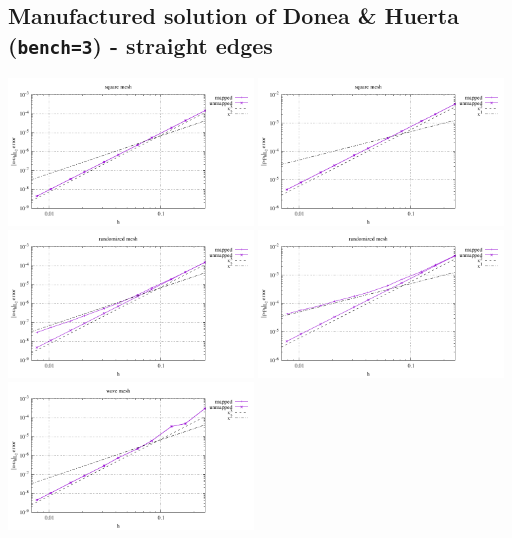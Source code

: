 \newpage
\subsection*{Manufactured solution of Donea \& Huerta ({\tt bench=3}) - straight edges}

\begin{center}
\includegraphics[width=6.5cm]{python_codes/fieldstone_76/results/bench3/straight/errors_V_mt1.pdf}
\includegraphics[width=6.5cm]{python_codes/fieldstone_76/results/bench3/straight/errors_P_mt1.pdf}\\
\includegraphics[width=6.5cm]{python_codes/fieldstone_76/results/bench3/straight/errors_V_mt2.pdf}
\includegraphics[width=6.5cm]{python_codes/fieldstone_76/results/bench3/straight/errors_P_mt2.pdf}\\
\includegraphics[width=6.5cm]{python_codes/fieldstone_76/results/bench3/straight/errors_V_mt3.pdf}

\end{center}
